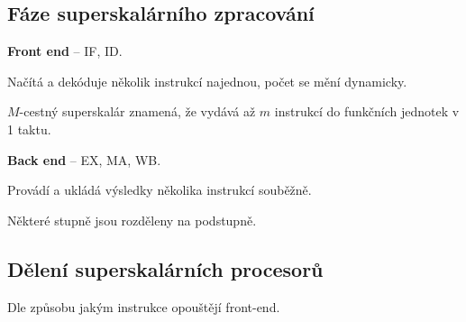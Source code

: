 \subsection{Fáze superskalárního zpracování}

\begin{compactitem}
    \item \textbf{Front end} -- IF, ID. \begin{compactitem}
        \item Načítá a dekóduje několik instrukcí najednou, počet se mění dynamicky.
        \item $M$-cestný superskalár znamená, že vydává až $m$ instrukcí do funkčních jednotek v 1 taktu.
    \end{compactitem}

    \item \textbf{Back end} -- EX, MA, WB. \begin{compactitem}
        \item Provádí a ukládá výsledky několika instrukcí souběžně.
        \item Některé stupně jsou rozděleny na podstupně.
    \end{compactitem}
\end{compactitem}

\subsection{Dělení superskalárních procesorů}

\begin{compactitem}
    \item Dle způsobu jakým instrukce opouštějí front-end.
\end{compactitem}

